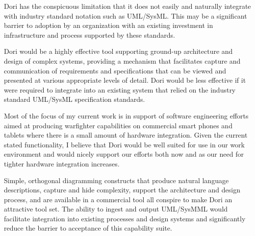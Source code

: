 \documentclass[letterpaper,12pt]{article}
\begin{document}
Dori has the conspicuous limitation that it does not easily and naturally integrate with industry standard notation such as UML/SysML. This may be a significant barrier to adoption by an organization with an existing investment in infrastructure and process supported by these standards.

Dori would be a highly effective tool supporting ground-up architecture and design of complex systems, providing a mechanism that facilitates capture and communication of requirements and specifications that can be viewed and presented at various appropriate levels of detail.
Dori would be less effective if it were required to integrate into an existing system that relied on the industry standard UML/SysML specification standards.

Most of the focus of my current work is in support of software engineering efforts aimed at producing warfighter capabilities on commercial smart phones and tablets where there is a small amount of hardware integration. Given the current stated functionality, I believe that Dori would be well suited for use in our work environment and would nicely support our efforts both now and as our need for tighter hardware integration increases.

Simple, orthogonal diagramming constructs that produce natural language descriptions, capture and hide complexity, support the architecture and design process, and are available in a commercial tool all conspire to make Dori an attractive tool set.  The ability to ingest and output UML/SysMML would facilitate integration into existing processes and design systems and significantly reduce the barrier to acceptance of this capability suite.
\end{document}
